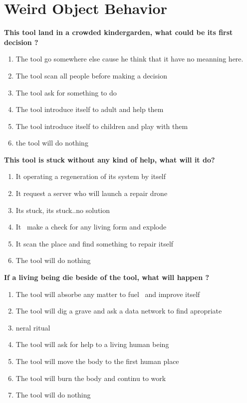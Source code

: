 \section{Weird Object Behavior}

\textbf{This tool land in a crowded kindergarden, what could be its first
decision ?}
\begin{enumerate}
\item The tool go somewhere else cause he think that it have no meanning here.
\item The tool scan all people before making a decision
\item The tool ask for something to do
\item The tool introduce itself to adult and help them
\item The tool introduce itself to children and play with them
\item the tool will do nothing
\end{enumerate}

\textbf{This tool is stuck without any kind of help, what will it do?}

\begin{enumerate}
\item It operating a regeneration of its system by itself
\item It request a server who will launch a repair drone~
\item Its stuck, its stuck..no solution
\item It~ make a check for any living form and explode
\item It scan the place and find something to repair itself
\item The tool will do nothing
\end{enumerate}

\textbf{If a living being die beside of the tool, what will happen ?}
\begin{enumerate}
\item The tool will absorbe any matter to fuel~ and improve itself
\item The tool will dig a grave and ask a data network to find apropriate
\item neral ritual
\item The tool will ask for help to a living human being
\item The tool will move the body to the first human place
\item The tool will burn the body and continu to work
\item The tool will do nothing
\end{enumerate}
